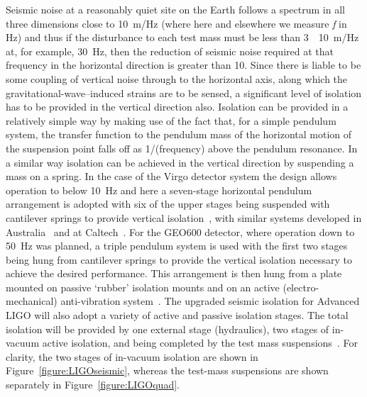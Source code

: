 \documentclass{article}
\begin{document}
Seismic noise at a reasonably quiet site on the Earth follows a
spectrum in all three dimensions close to 10~m/Hz (where here and elsewhere we measure
\textit{f} in Hz) and thus if the disturbance to each test mass must
be less than 3~\texttimes~10~m/Hz at, for
example, 30~Hz, then the reduction of seismic noise required at that
frequency in the horizontal direction is greater than
10. Since there is liable to be some coupling of vertical
noise through to the horizontal axis, along which the gravitational-wave--induced strains are to be sensed, a significant level of
isolation has to be provided in the vertical direction also. Isolation
can be provided in a relatively simple way by making use of the fact
that, for a simple pendulum system, the transfer function to the
pendulum mass of the horizontal motion of the suspension point falls
off as 1/(frequency) above the pendulum resonance. In a
similar way isolation can be achieved in the vertical direction by
suspending a mass on a spring. In the case of the Virgo detector
system the design allows operation to below 10~Hz and here a
seven-stage horizontal pendulum arrangement is adopted with six of the
upper stages being suspended with cantilever springs to provide vertical
isolation~\cite{Braccini}, with similar systems developed in
Australia~\cite{Ju1} and at Caltech~\cite{DeSalvo}. For the GEO600
detector, where operation down to 50~Hz was planned, a triple pendulum
system is used with the first two stages being hung from cantilever
springs to provide the vertical isolation necessary to achieve the
desired performance. This arrangement is then hung from a plate
mounted on passive `rubber' isolation mounts and on an active
(electro-mechanical) anti-vibration system~\cite{Plissi1, Torrie}. The
upgraded seismic isolation for Advanced LIGO will also adopt a
variety of active and passive isolation stages. The total isolation
will be provided by one external stage (hydraulics), two stages of
in-vacuum active isolation, and being completed by the test mass
suspensions~\cite{Abbott:2002, Harry:2010}. For clarity, the two
stages of in-vacuum isolation are shown in
Figure~\ref{figure:LIGOseismic}, whereas the test-mass suspensions are
shown separately in Figure~\ref{figure:LIGOquad}.
\end{document}
